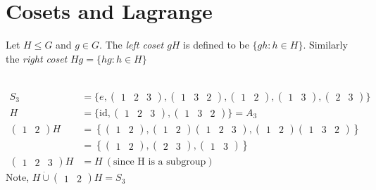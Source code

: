 \hypertarget{cosets-and-lagrange}{%
\section{Cosets and Lagrange}\label{cosets-and-lagrange}}

\begin{definition}[Cosets]
Let $H \leq G$ and $g \in G$.
The \emph{left coset $gH$} is defined to be $\{ gh : h \in H \}$.
Similarly the \emph{right coset} $Hg = \{ hg : h \in H \}$
\end{definition}

\begin{example} ~\vspace*{-1.5\baselineskip}
\begin{align*}
    S_3 &= \{ e, \begin{pmatrix}1 & 2 & 3\end{pmatrix}, \begin{pmatrix}1 & 3 & 2\end{pmatrix}, \begin{pmatrix}1 & 2\end{pmatrix}, \begin{pmatrix}1 & 3\end{pmatrix}, \begin{pmatrix}2 & 3\end{pmatrix} \} \\
    H &= \{ \text{id}, \begin{pmatrix}1 & 2 & 3\end{pmatrix}, \begin{pmatrix}1 & 3 & 2\end{pmatrix} \} = A_3 \\
    \begin{pmatrix}1 & 2\end{pmatrix}H &= \left\{ \begin{pmatrix}1 & 2\end{pmatrix}, \begin{pmatrix}1 & 2\end{pmatrix}\begin{pmatrix}1 & 2 & 3\end{pmatrix}, \begin{pmatrix}1 & 2\end{pmatrix}\begin{pmatrix}1 & 3 & 2\end{pmatrix} \right\} \\
    &= \left\{ \begin{pmatrix}1 & 2\end{pmatrix}, \begin{pmatrix}2 & 3\end{pmatrix}, \begin{pmatrix}1 & 3\end{pmatrix} \right\} \\
    \begin{pmatrix}1 & 2 & 3\end{pmatrix}H &= H \ (\text{since H is a subgroup})
\end{align*}
Note, $H \mathbin{\dot{\cup}} \begin{pmatrix}1 & 2\end{pmatrix}H = S_3$
\end{example}

